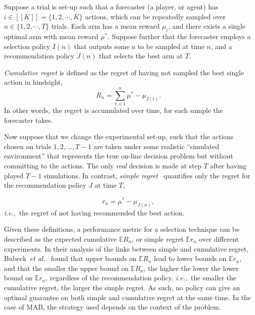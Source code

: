 \documentclass[a4paper]{llncs}
\newcommand{\ie}{{\it i.e.,}~}
\newcommand{\bE}{\mathbb{E}}
\begin{document}
Suppose a trial is set-up such that a forecaster (a player, or agent) has $i \in [[K]] = \{1, 2, \cdots, K \}$ actions, which can be repeatedly sampled over $n \in \{ 1, 2, \cdots, T \}$ trials. 
Each arm has a mean reward $\mu_i$, and there exists a single optimal arm with mean reward $\mu^*$. 
Suppose further that the forecaster employs a selection policy $I(n)$ that outputs some $a$ to be sampled at time $n$, and a recommendation policy $J(n)$ that selects the best arm at $T$.

\emph{Cumulative regret} is defined as the regret of having not sampled the best single action in hindsight, 
\begin{equation}
R_n = \sum_{t = 1}^{n}{\mu^* - \mu_{I(t)}}.
\end{equation}
In other words, the regret is accumulated over time, for each sample the forecaster takes.

Now suppose that we change the experimental set-up, such that the actions chosen on trials $1, 2, \ldots, T-1$ are taken under some realistic ``simulated environment'' that represents the true on-line decision problem but without committing to the actions. The only \emph{real} decision is made at step $T$ after having played $T-1$ simulations. In contrast, \emph{simple regret}~\cite{Bubeck11Pure} quantifies only the regret for the recommendation policy $J$ at time $T$,

\begin{equation}
r_n = \mu^* - \mu_{J(n)},
\end{equation}
\ie the regret of not having recommended the best action.

Given these definitions, a performance metric for a selection technique can be described as the expected cumulative $\bE R_n$, or simple regret $\bE r_n$ over different
experiments. In their analysis of the links between simple and cumulative regret, Bubeck~\emph{et al.}~\cite{Bubeck11Pure} found that upper bounds on $\bE R_n$ lead to lower bounds on $\bE r_n$, and that the smaller the upper bound on $\bE R_n$, the higher the lower the lower bound on $\bE r_n$, regardless of the recommendation policy. \ie the smaller the cumulative regret, the larger the simple regret. As such, no policy can give an optimal guarantee on both simple and cumulative regret at the same time. In the case of MAB, the strategy used depends on the context of the problem.
\end{document}
